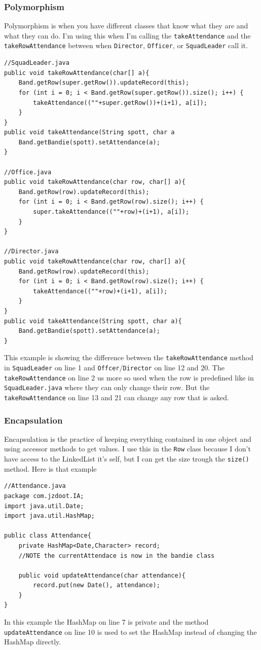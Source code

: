 \documentclass{article}
\begin{document}
\subsubsection{Polymorphism}
Polymorphism is when you have different classes that know what they are and what they can do. I'm using this when I'm calling the \verb|takeAttendance| and the \verb|takeRowAttendance| between when \verb|Director|, \verb|Officer|, or \verb|SquadLeader| call it.
\begin{lstlisting}
//SquadLeader.java
public void takeRowAttendance(char[] a){
	Band.getRow(super.getRow()).updateRecord(this);
	for (int i = 0; i < Band.getRow(super.getRow()).size(); i++) {
		takeAttendance((""+super.getRow())+(i+1), a[i]);
	}
}
public void takeAttendance(String spott, char a
	Band.getBandie(spott).setAttendance(a);
}

//Office.java
public void takeRowAttendance(char row, char[] a){
	Band.getRow(row).updateRecord(this);
	for (int i = 0; i < Band.getRow(row).size(); i++) {
		super.takeAttendance((""+row)+(i+1), a[i]);
	}
}

//Director.java
public void takeRowAttendance(char row, char[] a){
	Band.getRow(row).updateRecord(this);
	for (int i = 0; i < Band.getRow(row).size(); i++) {
		takeAttendance((""+row)+(i+1), a[i]);
	}
}
public void takeAttendance(String spott, char a){
	Band.getBandie(spott).setAttendance(a);
}
\end{lstlisting}
This example is showing the difference between the \verb|takeRowAttendance| method in \verb|SquadLeader| on line 1 and \verb|Offcer|/\verb|Director| on line 12 and 20. The \verb|takeRowAttendance| on line 2 us more so used when the row is predefined like in \verb|SquadLeader.java| where they can only change their row. But the \verb|takeRowAttendance| on line 13 and 21 can change any row that is asked.
\subsubsection{Encapsulation}
Encapsulation is the practice of keeping everything contained in one object and using accessor methods to get values. I use this in the \verb|Row| class because I don't have access to the LinkedList\cite{linkedList} it's self, but I can get the size trough the \verb|size()| method. Here is that example
\begin{lstlisting}
//Attendance.java
package com.jzdoot.IA;
import java.util.Date;
import java.util.HashMap;

public class Attendance{
	private HashMap<Date,Character> record;
	//NOTE the currentAttendace is now in the bandie class

	public void updateAttendance(char attendance){
		record.put(new Date(), attendance);
	}
}
\end{lstlisting}
In this example the HashMap\cite{hashMap} on line 7 is private and the method \verb|updateAttendance| on line 10 is used to set the HashMap\cite{hashMap} instead of changing the HashMap\cite{hashMap} directly.
\end{document}
